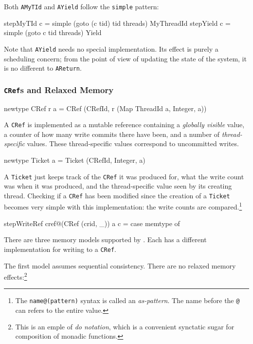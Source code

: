 Both \verb|AMyTId| and \verb|AYield| follow the \verb|simple| pattern:

\begin{haskellcode}
stepMyTId c = simple (goto (c tid) tid threads) MyThreadId
stepYield c = simple (goto c tid threads) Yield
\end{haskellcode}

Note that \verb|AYield| needs no special implementation. Its effect is
purely a scheduling concern; from the point of view of updating the
state of the system, it is no different to \verb|AReturn|.

\subsubsection{\texttt{CRef}s and Relaxed Memory}
\label{sec:execution-stepwise-cref}

\begin{haskellcode}
newtype CRef r a = CRef (CRefId, r (Map ThreadId a, Integer, a))
\end{haskellcode}

A \verb|CRef| is implemented as a mutable reference containing a
\emph{globally visible} value, a counter of how many write commits
there have been, and a number of \emph{thread-specific} values. These
thread-specific values correspond to uncommitted writes.

\begin{haskellcode}
newtype Ticket a = Ticket (CRefId, Integer, a)
\end{haskellcode}

A \verb|Ticket| just keeps track of the \verb|CRef| it was produced
for, what the write count was when it was produced, and the
thread-specific value seen by its creating thread. Checking if a
\verb|CRef| has been modified since the creation of a \verb|Ticket|
becomes very simple with this implementation: the write counts are
compared.\footnote{The \texttt{name@(pattern)} syntax is called an
  \emph{as-pattern}. The name before the \texttt{@} can refers to the
  entire value.}

\begin{haskellcode}
stepWriteRef cref@(CRef (crid, _)) a c = case memtype of
\end{haskellcode}

There are three memory models supported by \dejafu{}. Each has a
different implementation for writing to a \verb|CRef|.

The first model assumes sequential consistency. There are no relaxed
memory effects:\footnote{This is an emple of \emph{do notation}, which
  is a convenient synctatic sugar for composition of monadic
  functions.}


